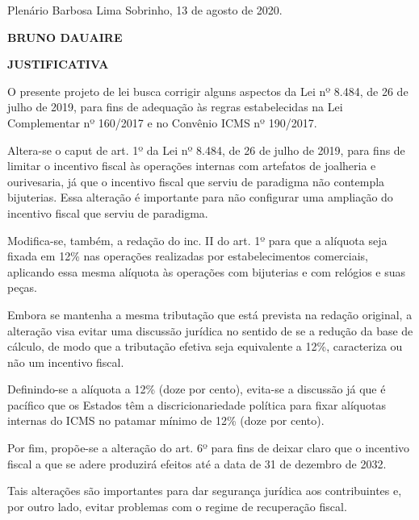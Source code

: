 \documentclass[10pt]{article}
\begin{document}
\begin{center}
  Plenário Barbosa Lima Sobrinho, 13 de agosto de 2020.

   \bigskip

  \textbf{ BRUNO DAUAIRE}

  \bigskip

  \textbf{JUSTIFICATIVA}
  \bigskip

\end{center}

  O presente projeto de lei busca corrigir alguns aspectos da Lei nº 8.484, de 26 de julho de 2019, para fins de adequação às regras estabelecidas na Lei Complementar nº 160/2017 e no Convênio ICMS nº 190/2017.

Altera-se o caput de art. 1º da Lei nº 8.484, de 26 de julho de 2019, para fins de limitar o incentivo fiscal às operações internas com artefatos de joalheria e ourivesaria, já que o incentivo fiscal que serviu de paradigma não contempla bijuterias. Essa alteração é importante para não configurar uma ampliação do incentivo fiscal que serviu de paradigma.

Modifica-se, também, a redação do inc. II do art. 1º para que a alíquota seja fixada em 12\% nas operações realizadas por estabelecimentos comerciais, aplicando
essa mesma alíquota às operações com bijuterias e com relógios e suas peças.

Embora se mantenha a mesma tributação que está prevista na redação original, a alteração visa evitar uma discussão jurídica no sentido de se a redução da base de
cálculo, de modo que a tributação efetiva seja equivalente a 12\%, caracteriza ou não um incentivo fiscal.

Definindo-se a alíquota a 12\% (doze por cento), evita-se a discussão já que é pacífico que os Estados têm a discricionariedade política para fixar alíquotas internas
do ICMS no patamar mínimo de 12\% (doze por cento).

Por fim, propõe-se a alteração do art. 6º para fins de deixar claro que o incentivo fiscal a que se adere produzirá efeitos até a data de 31 de dezembro de 2032.

Tais alterações são importantes para dar segurança jurídica aos contribuintes e, por outro lado, evitar problemas com o regime de recuperação fiscal.



\iffalse
\begin{center}
  \textbf{REFERÊNCIAS}
\end{center}


\fi
\end{document}
